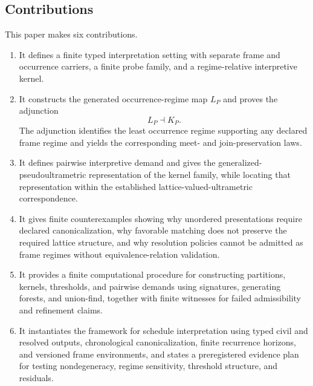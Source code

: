 \documentclass[11pt]{article}
\theoremstyle{plain}
\theoremstyle{definition}
\theoremstyle{remark}
\begin{document}
\subsection{Contributions}

This paper makes six contributions.

\begin{enumerate}
  \item It defines a finite typed interpretation setting
        with separate frame
        and occurrence carriers,
        a finite probe family,
        and a regime-relative interpretive kernel.

  \item It constructs the generated occurrence-regime map
        \(L_P\)
        and proves the adjunction
        \[
          L_P
          \dashv
          K_P.
        \]
        The adjunction identifies
        the least occurrence regime
        supporting any declared frame regime
        and yields the corresponding
        meet-
        and join-preservation laws.

  \item It defines pairwise interpretive demand
        and gives the generalized-pseudoultrametric representation
        of the kernel family,
        while locating that representation
        within the established lattice-valued-ultrametric correspondence.

  \item It gives finite counterexamples
        showing why unordered presentations require
        declared canonicalization,
        why favorable matching does not preserve
        the required lattice structure,
        and why resolution policies
        cannot be admitted as frame regimes
        without equivalence-relation validation.

  \item It provides a finite computational procedure
        for constructing partitions,
        kernels,
        thresholds,
        and pairwise demands
        using signatures,
        generating forests,
        and union-find,
        together with finite witnesses
        for failed admissibility
        and refinement claims.

  \item It instantiates the framework
        for schedule interpretation
        using typed civil and resolved outputs,
        chronological canonicalization,
        finite recurrence horizons,
        and versioned frame environments,
        and states a preregistered evidence plan
        for testing nondegeneracy,
        regime sensitivity,
        threshold structure,
        and residuals.
\end{enumerate}
\end{document}
